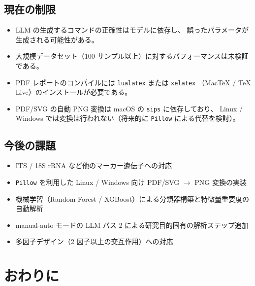 \documentclass[12pt, a4paper]{article}
\begin{document}
\subsection{現在の制限}

\begin{itemize}
  \item LLM の生成するコマンドの正確性はモデルに依存し、
    誤ったパラメータが生成される可能性がある。
  \item 大規模データセット（100 サンプル以上）に対するパフォーマンスは未検証である。
  \item PDF レポートのコンパイルには \texttt{lualatex} または \texttt{xelatex}
    （MacTeX / TeX Live）のインストールが必要である。
  \item PDF/SVG の自動 PNG 変換は macOS の \texttt{sips} に依存しており、
    Linux / Windows では変換は行われない（将来的に \texttt{Pillow} による代替を検討）。
\end{itemize}

\subsection{今後の課題}

\begin{itemize}
  \item ITS / 18S rRNA など他のマーカー遺伝子への対応
  \item \texttt{Pillow} を利用した Linux / Windows 向け PDF/SVG $\to$ PNG 変換の実装
  \item 機械学習（Random Forest / XGBoost）による分類器構築と特徴量重要度の自動解析
  \item manual-auto モードの LLM パス 2 による研究目的固有の解析ステップ追加
  \item 多因子デザイン（2 因子以上の交互作用）への対応
\end{itemize}

\section{おわりに}
\end{document}

